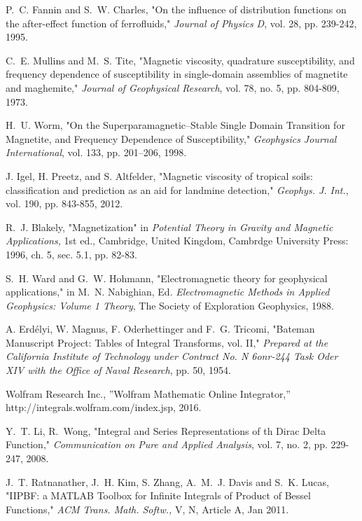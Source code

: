 \documentclass[onecolumn]{IEEEtran} %
\begin{document}
\begin{thebibliography}{100}
P.~C. Fannin and S.~W. Charles, "On the influence of distribution functions on the after-effect function of ferrofluids," \emph{Journal of Physics D}, vol. 28, pp. 239-242, 1995.

C.~E. Mullins and M.~S. Tite, "Magnetic viscosity, quadrature susceptibility, and frequency dependence of susceptibility in single-domain assemblies of magnetite and maghemite," \emph{Journal of Geophysical Research}, vol. 78, no. 5, pp. 804-809, 1973.

H.~U. Worm, "On the Superparamagnetic–Stable Single Domain Transition for Magnetite, and Frequency Dependence of Susceptibility," \emph{Geophysics Journal International}, vol. 133, pp. 201–206, 1998.

J. Igel, H. Preetz, and S. Altfelder, "Magnetic viscosity of tropical soils: classification and prediction as an aid for landmine detection," \emph{Geophys. J. Int.}, vol. 190, pp. 843-855, 2012.

R.~J. Blakely, "Magnetization" in \emph{Potential Theory in Gravity and Magnetic Applications,} 1st ed., Cambridge, United Kingdom, Cambrdge University Press: 1996, ch. 5, sec. 5.1, pp. 82-83.

S.~H. Ward and G.~W. Hohmann, "Electromagnetic theory for geophysical applications," in M.~N. Nabighian, Ed. \emph{Electromagnetic Methods in Applied Geophysics: Volume 1 Theory}, The Society of Exploration Geophysics, 1988.

A. Erd\'{e}lyi, W. Magnus, F. Oderhettinger and F.~G. Tricomi, "Bateman Manuscript Project: Tables of Integral Transforms, vol. II," \emph{Prepared at the California Institute of Technology under Contract No. N 6onr-244 Task Oder XIV with the Office of Naval Research}, pp. 50, 1954.

Wolfram Research Inc., ”Wolfram Mathematic Online Integrator,” http://integrals.wolfram.com/index.jsp, 2016. 

Y.~T. Li, R.~Wong, "Integral and Series Representations of th Dirac Delta Function," \emph{Communication on Pure and Applied Analysis}, vol. 7, no. 2, pp. 229-247, 2008.

J.~T. Ratnanather, J.~H. Kim, S. Zhang, A.~M.~J. Davis and S.~K. Lucas, "IIPBF: a MATLAB Toolbox for Infinite Integrals of Product of Bessel Functions," \emph{ACM Trans. Math. Softw.,} V, N, Article A, Jan 2011.


\end{thebibliography}
\end{document}
